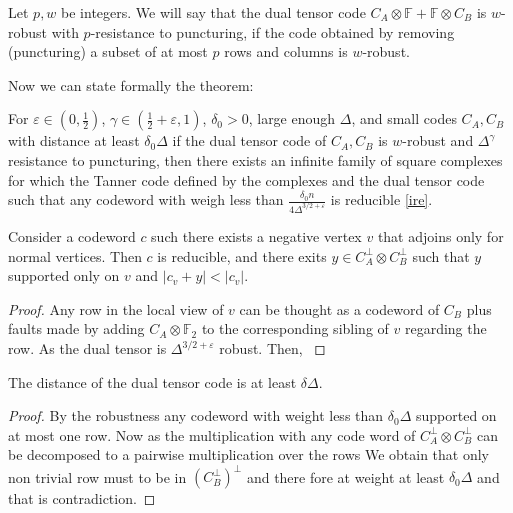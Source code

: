 \begin{definition} Let $p,w$ be integers. We will say that the dual tensor code $C_{A} \otimes \mathbb{F} + \mathbb{F} \otimes C_{B}$ is $w$-robust with $p$-resistance to puncturing, if the code obtained by removing (puncturing) a subset of at most $p$ rows and columns is $w$-robust.   
\end{definition}

Now we can state formally the theorem: 

\begin{theorem}
  For $\varepsilon \in \left( 0,\frac{1}{2} \right)$, $\gamma\in \left( \frac{1}{2} + \varepsilon, 1 \right)$, $\delta_{0}> 0$, large enough $\Delta$, and small codes $C_{A},C_{B}$ with distance at least $\delta_{0}\Delta$ if the dual tensor code of $C_{A},C_{B}$ is $w$-robust and $\Delta^{\gamma}$ resistance to puncturing, then there exists an infinite family of square complexes for which the Tanner code defined by the complexes and the dual tensor code such that any codeword with weigh less than $ \frac{\delta_{0} n}{4\Delta^{3/2 + \varepsilon}} $ is reducible \cref{ire}.
\end{theorem}

\begin{claim}
  Consider a codeword $c$ such there exists a negative vertex $v$ that adjoins only for normal vertices. Then $c$ is reducible, and there exits $y \in C_{A}^{\perp}\otimes C_{B}^{\perp}$ such that $y$ supported only on $v$ and $ | c_{v} + y | < |c_{v}| $.       
\end{claim}

\begin{proof}
  Any row in the local view of $v$ can be thought as a codeword of $C_{B}$ plus faults made by adding $C_{A}\otimes \mathbb{F}_{2}$ to the corresponding sibling of $v$ regarding the row. As the dual tensor is $\Delta^{3/2+\varepsilon}$ robust. Then, \cite{kalachev2022twosided}       
\end{proof}


\begin{claim}
  The distance of the dual tensor code is at least $\delta\Delta$.
\end{claim}
\begin{proof}
  By the robustness any codeword with weight less than $\delta_{0}\Delta$ supported on at most one row. Now as the multiplication with any code word of $C_{A}^\perp \otimes C_{B}^\perp$ can be decomposed to a pairwise multiplication over the rows We obtain that only non trivial row must to be in $ \left( C_{B}^{\perp} \right)^{\perp}$ and there fore at weight at least $\delta_{0}\Delta$ and that is contradiction.  
\end{proof}


